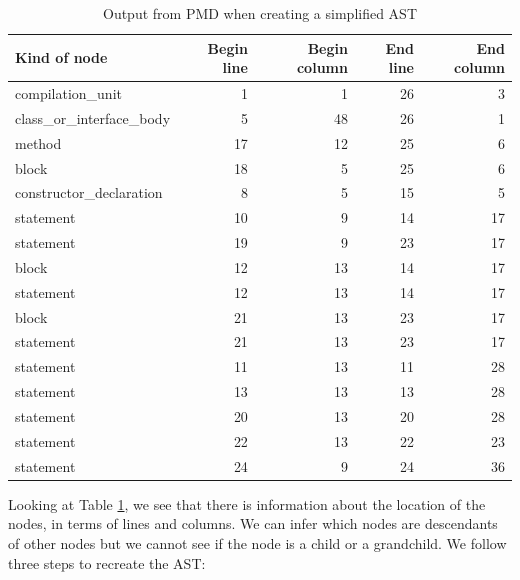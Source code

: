 \documentclass[
]{article}
\begin{document}
\begin{table}[!h]

\caption{\label{tab:unnamed-chunk-2}Output from PMD when creating a simplified AST\label{tab_nodes}}
\centering
\begin{tabular}[t]{l|r|r|r|r}
\hline
Kind of node & Begin line & Begin column & End line & End column\\
\hline
\rowcolor{gray!6}  compilation\_unit & 1 & 1 & 26 & 3\\
\hline
class\_or\_interface\_body & 5 & 48 & 26 & 1\\
\hline
\rowcolor{gray!6}  method & 17 & 12 & 25 & 6\\
\hline
block & 18 & 5 & 25 & 6\\
\hline
\rowcolor{gray!6}  constructor\_declaration & 8 & 5 & 15 & 5\\
\hline
statement & 10 & 9 & 14 & 17\\
\hline
\rowcolor{gray!6}  statement & 19 & 9 & 23 & 17\\
\hline
block & 12 & 13 & 14 & 17\\
\hline
\rowcolor{gray!6}  statement & 12 & 13 & 14 & 17\\
\hline
block & 21 & 13 & 23 & 17\\
\hline
\rowcolor{gray!6}  statement & 21 & 13 & 23 & 17\\
\hline
statement & 11 & 13 & 11 & 28\\
\hline
\rowcolor{gray!6}  statement & 13 & 13 & 13 & 28\\
\hline
statement & 20 & 13 & 20 & 28\\
\hline
\rowcolor{gray!6}  statement & 22 & 13 & 22 & 23\\
\hline
statement & 24 & 9 & 24 & 36\\
\hline
\end{tabular}
\end{table}

\normalsize

Looking at Table \ref{tab_nodes}, we see that there is information about
the location of the nodes, in terms of lines and columns. We can infer
which nodes are descendants of other nodes but we cannot see if the node
is a child or a grandchild. We follow three steps to recreate the AST:
\end{document}
